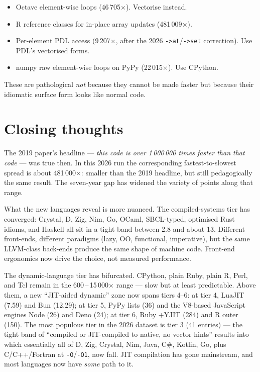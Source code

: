 \documentclass[11pt,a4paper]{article}
\begin{document}
\begin{itemize}
\item Octave element-wise loops (46\,705$\times$). Vectorise instead.
\item R reference classes for in-place array updates (481\,009$\times$).
\item Per-element PDL access (9\,207$\times$, after the 2026 \texttt{->at}/\texttt{->set} correction). Use PDL's vectorised forms.
\item numpy raw element-wise loops on PyPy (22\,015$\times$). Use CPython.
\end{itemize}

\noindent
These are pathological \emph{not} because they cannot be made faster
but because their idiomatic surface form looks like normal code.

\section{Closing thoughts}

The 2019 paper's headline --- \emph{this code is over 1\,000\,000
times faster than that code} --- was true then. In this 2026 run
the corresponding fastest-to-slowest spread is about
481\,000$\times$: smaller than the 2019 headline, but still
pedagogically the same result. The seven-year gap has widened the
variety of points along that range.

What the new languages reveal is more nuanced. The compiled-systems
tier has converged: Crystal, D, Zig, Nim, Go, OCaml, SBCL-typed,
optimised Rust idioms, and Haskell all sit in a tight band between
2.8 and about 13. Different
front-ends, different paradigms (lazy, OO, functional, imperative),
but the same LLVM-class back-ends produce the same shape of machine
code. Front-end ergonomics now drive the choice, not measured
performance.

The dynamic-language tier has bifurcated. CPython, plain Ruby, plain
R, Perl, and Tcl remain in the 600\,--\,15\,000$\times$ range --- slow
but at least predictable. Above them, a new ``JIT-aided dynamic''
zone now spans tiers 4--6: at tier 4, LuaJIT (7.59) and Bun (12.29);
at tier 5, PyPy lists (36) and the V8-based JavaScript engines Node
(26) and Deno (24); at tier 6, Ruby +YJIT (284) and R outer (150).
The most populous tier in the 2026 dataset is tier 3 (41 entries) ---
the tight band of ``compiled or JIT-compiled to native, no vector
hints'' results into which essentially all of D, Zig, Crystal, Nim,
Java, C\#, Kotlin, Go, plus C/C++/Fortran at \verb|-O|/\verb|-O1|,
now fall. JIT compilation has gone mainstream, and most languages
now have \emph{some} path to it.
\end{document}

